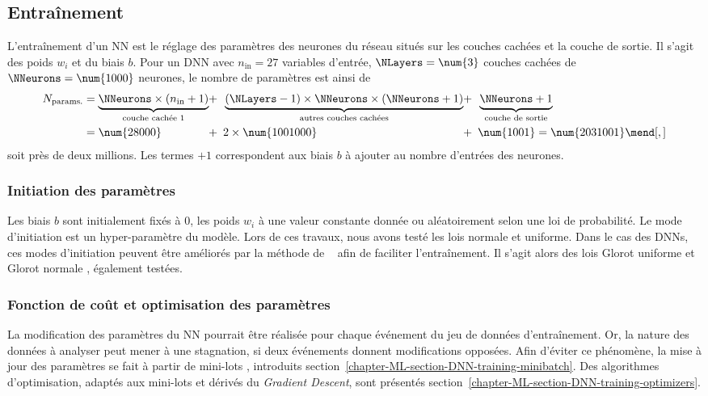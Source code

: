 \subsection{Entraînement}\label{chapter-ML-section-DNN-training}
L'entraînement d'un NN est le réglage des paramètres des neurones du réseau situés sur les couches cachées et la couche de sortie.
Il s'agit des poids $w_i$ et du biais $b$.
Pour un DNN avec
$n_\text{in} = \num{27}$ variables d'entrée,
$\NLayers = \num{3}$ couches cachées
de $\NNeurons = \num{1000}$ neurones,
le nombre de paramètres est ainsi de
\begin{align}
N_\text{params.}
&= \underbrace{\NNeurons \times (n_\text{in} + 1)}_\text{couche cachée 1} \!\!\!&\!\!\!+\,\,\,& \underbrace{(\NLayers -1)\times \NNeurons \times(\NNeurons+1)}_\text{autres couches cachées} \!\!\!&\!\!\!+\,\,\,& \underbrace{\NNeurons +1\vphantom{()}}_\text{couche de sortie}
\nonumber\\&
=
\num{28000} \!\!\!&\!\!\!+\,\,\,& 2\times\num{1001000} \!\!\!&\!\!\!+\,\,\,& \num{1001}
=
\num{2031001}
\mend[,]
\end{align}
soit près de deux millions.
Les termes \og $+1$ \fg{} correspondent aux biais $b$ à ajouter au nombre d'entrées des neurones.
\subsubsection{Initiation des paramètres}
Les biais $b$ sont initialement fixés à 0,
les poids $w_i$ à une valeur constante donnée ou aléatoirement selon une loi de probabilité.
Le mode d'initiation est un hyper-paramètre du modèle.
Lors de ces travaux, nous avons testé les lois normale et uniforme.
Dans le cas des DNNs, ces modes d'initiation peuvent être améliorés par la méthode de \citeauthor{glorot}~\cite{glorot} afin de faciliter l'entraînement.
Il s'agit alors des lois \og Glorot uniforme \fg{} et \og Glorot normale \fg, également testées.
\subsubsection{Fonction de coût et optimisation des paramètres}
La modification des paramètres du NN pourrait être réalisée  pour chaque événement du jeu de données d'entraînement.
Or, la nature des données à analyser peut mener à une stagnation, si deux événements donnent modifications opposées.
Afin d'éviter ce phénomène, la mise à jour des paramètres se fait à partir de \og mini-lots \fg, introduits section~\ref{chapter-ML-section-DNN-training-minibatch}.
Des algorithmes d'optimisation, adaptés aux mini-lots et dérivés du \emph{Gradient Descent}, sont présentés section~\ref{chapter-ML-section-DNN-training-optimizers}.
